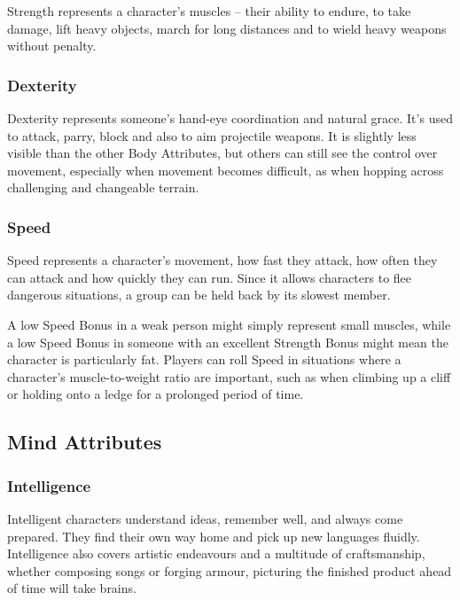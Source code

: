 \begin{multicols}{2}
Strength represents a character's muscles -- their ability to endure, to take damage, lift heavy objects, march for long distances and to wield heavy weapons without penalty.

\subsubsection[Dexterity]{Dexterity }

Dexterity represents someone's hand-eye coordination and natural grace.
It's used to attack, parry, block and also to aim projectile weapons.
It is slightly less visible than the other Body Attributes, but others can still see the control over movement, especially when movement becomes difficult, as when hopping across challenging and changeable terrain.

\subsubsection[Speed]{Speed }

Speed represents a character's movement, how fast they attack, how often they can attack and how quickly they can run.
Since it allows characters to flee dangerous situations, a group can be held back by its slowest member.

A low Speed Bonus in a weak person might simply represent small muscles, while a low Speed Bonus in someone with an excellent Strength Bonus might mean the character is particularly fat.
Players can roll Speed in situations where a character's muscle-to-weight ratio are important, such as when climbing up a cliff or holding onto a ledge for a prolonged period of time.

\subsection{Mind Attributes}

\subsubsection[Intelligence]{Intelligence }

Intelligent characters understand ideas, remember well, and always come prepared.
They find their own way home and pick up new languages fluidly.
Intelligence also covers artistic endeavours and a multitude of craftsmanship, whether composing songs or forging armour, picturing the finished product ahead of time will take brains.


\end{multicols}
